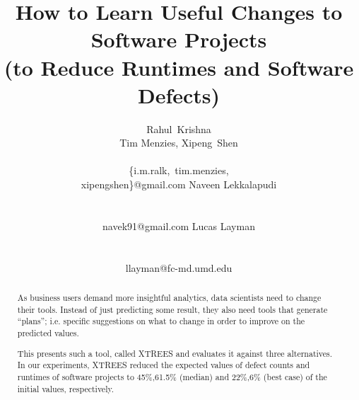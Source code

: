 \documentclass{sig-alternate}
\begin{document}
  


\title{How to Learn Useful Changes to Software Projects\\(to Reduce Runtimes and Software Defects)}
\author{
\alignauthor 
Rahul~Krishna\\Tim Menzies, Xipeng~Shen \\
       \\
       {\{i.m.ralk,~tim.menzies,\\xipengshen\}@gmail.com}
\alignauthor
Naveen   Lekkalapudi\\
  \\ 
       \\ 
       {navek91@gmail.com}
\alignauthor
Lucas Layman \\
        \\ 
       \\ 
       {llayman@fc-md.umd.edu}
\setlength{\columnsep}{7mm}
}
\maketitle
\begin{abstract}
 As business users demand more insightful
 analytics, data scientists need to change
 their tools. Instead of just predicting 
 some result, they also need tools that generate ``plans'';
 i.e. specific suggestions on  what to change  in order to
 improve on the predicted values.
 
This presents such a tool, called XTREES and evaluates it against three alternatives.
In our experiments, XTREES reduced
 the expected values of defect counts and  runtimes of software projects to    
 45\%,61.5\%  (median) and 22\%,6\% (best case) of the initial values, respectively.
\end{abstract}
\end{document}
